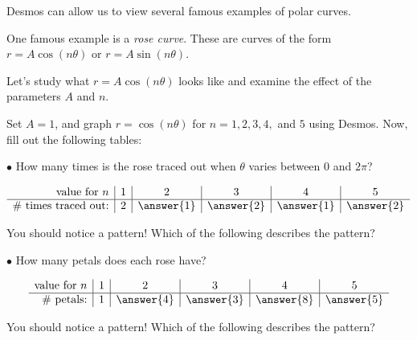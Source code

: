 \documentclass{ximera}
\author{Jim Talamo}
\begin{document}
\begin{exercise}
Desmos can allow us to view several famous examples of polar curves.

One famous example is a \emph{rose curve}.  These are curves of the form $r= A \cos(n \theta)$ or $r= A \sin(n \theta)$.

\begin{exercise}
Let's study what $r= A \cos(n \theta)$ looks like and examine the effect of the parameters $A$ and $n$.  

Set $A=1$, and graph $r=\cos(n \theta)$ for $n=1,2,3,4,$ and $5$ using Desmos.  Now, fill out the following tables:

$\bullet$ How many times is the rose traced out when $\theta$ varies between $0$ and $2 \pi$?

\[
\begin{array}{r|c|c|c|c|c}
\textrm{value for } n & 1 & 2 & 3 & 4 & 5 \\
\hline
\textrm{\# times traced out:} & 2 & \answer{1} & \answer{2} & \answer{1} & \answer{2}
\end{array}
\]

\begin{exercise}
You should notice a pattern! Which of the following describes the pattern?
\begin{multipleChoice}
\end{multipleChoice}
\end{exercise}

$\bullet$ How many petals does each rose have?

\[
\begin{array}{r|c|c|c|c|c}
\textrm{value for } n & 1 & 2 & 3 & 4 & 5 \\
\hline
\textrm{\# petals:} & 1 & \answer{4} & \answer{3} & \answer{8} & \answer{5}
\end{array}
\]

\begin{exercise}
You should notice a pattern! Which of the following describes the pattern?
\begin{multipleChoice}
\end{multipleChoice}
\end{exercise}


\end{exercise}
\end{exercise}
\end{document}
